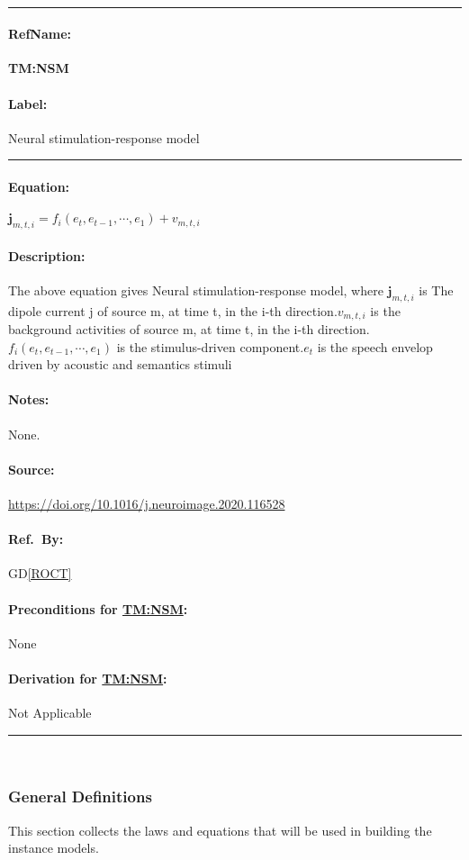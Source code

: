\documentclass[12pt]{article}
\newcommand{\dref}[1]{GD\ref{#1}}
\newcommand{\deftheory}[9][Not Applicable]
{
\newpage
\noindent \rule{\textwidth}{0.5mm}

\paragraph{RefName: } \textbf{#2} \phantomsection 
\label{#2}

\paragraph{Label:} #3

\noindent \rule{\textwidth}{0.5mm}

\paragraph{Equation:}

#4

\paragraph{Description:}

#5

\paragraph{Notes:}

#6

\paragraph{Source:}

#7

\paragraph{Ref.\ By:}

#8

\paragraph{Preconditions for \hyperref[#2]{#2}:}
\label{#2_precond}

#9

\paragraph{Derivation for \hyperref[#2]{#2}:}
\label{#2_deriv}

#1

\noindent \rule{\textwidth}{0.5mm}

}
\begin{document}
~\newline

\noindent
\deftheory
{TM:NSM}
{Neural stimulation-response model}
{

$\boldsymbol{j}_{m, t, i}=f_{i}\left(e_{t}, e_{t-1}, \cdots, e_{1}\right)+v_{m, t, i}$

}
{
  The above equation gives Neural stimulation-response model, where ${\boldsymbol{j}_{m, t, i}}$
is The dipole current j of source m, at time t, in the i-th direction.${v_{m, t, i}} $ is the background
activities of source m, at time t, in the i-th direction.${f_{i}\left(e_{t}, e_{t-1}, \cdots, e_{1}\right)}$
is the stimulus-driven component.$e_{t}$ is the speech envelop driven by acoustic and semantics stimuli

}
{
None.
}
{
  \url{https://doi.org/10.1016/j.neuroimage.2020.116528}
}
{
  \dref{ROCT}
}
{
None
}
{}


~\newline

\subsubsection{General Definitions}\label{sec_gendef}


This section collects the laws and equations that will be used in building the
instance models.
\end{document}
